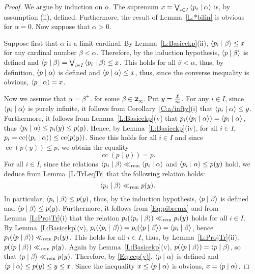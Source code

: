 \documentclass[psamsfonts,reqno]{memo-l}
\theoremstyle{plain}
\theoremstyle{definition}
\theoremstyle{remark}
\numberwithin{equation}{section}
\newcommand{\Cn}{\mathbf{2}_{\infty}}
\newcommand{\rem}{\ll_{\mathrm{rem}}}
\newcommand{\scal}[2]{\left\langle\nobreak#1\nobreak\mid\nobreak#2
\nobreak\right\rangle}
\newcommand{\di}[1]{\tfrac{\mathstrut\textstyle{#1}}{\scriptstyle{\infty}}}
\DeclareMathOperator{\cc}{cc}
\begin{document}
\begin{proof}
We argue by induction on $\alpha$.
The supremum $x=\bigvee_{i\in I}\scal{p_i}{\alpha}$ is, by assumption
(ii), defined. Furthermore, the result of Lemma~\ref{L:*bilin} is obvious
for $\alpha=0$. Now suppose that $\alpha>0$.

Suppose first that $\alpha$ is a limit cardinal. By
Lemma~\ref{L:Basicekp}(ii), $\scal{p_i}{\beta}\leq x$ for any cardinal
number $\beta<\alpha$. Therefore, by the induction hypothesis,
$\scal{p}{\beta}$ is defined and
$\scal{p}{\beta}=\bigvee_{i\in I}\scal{p_i}{\beta}\leq x$. This holds for
all $\beta<\alpha$, thus, by definition,
$\scal{p}{\alpha}$ is defined and $\scal{p}{\alpha}\leq x$, thus, since the
converse inequality is obvious, $\scal{p}{\alpha}=x$.

Now we assume that $\alpha=\beta^+$, for some $\beta\in\Cn$.
Put $y=\di{x}$. For any $i\in I$, since $\scal{p_i}{\alpha}$ is purely
infinite, it follows from Corollary~\ref{C:a/infty}(i) that
$\scal{p_i}{\alpha}\leq y$. Furthermore, it follows from
Lemma~\ref{L:Basicekp}(v) that
$p_i(\scal{p_i}{\alpha})=\scal{p_i}{\alpha}$, thus
$\scal{p_i}{\alpha}\leq p_i(y)\leq p(y)$. Hence, by
Lemma~\ref{L:Basicekp}(iv), for all $i\in I$,
$p_i=\cc(\scal{p_i}{\alpha})\leq\cc(p(y))$. Since this holds for all $i\in
I$ and since $\cc(p(y))\leq p$, we obtain the equality
   \begin{equation}\label{Eq:ccp(y)}
   \cc(p(y))=p.
   \end{equation}
For all $i\in I$, since the relations
$\scal{p_i}{\beta}\rem\scal{p_i}{\alpha}$ and $\scal{p_i}{\alpha}\leq p(y)$
hold, we deduce from Lemma~\ref{L:TrLeqTr} that the following relation
holds:
   \begin{equation}\label{Eq:pibremx}
   \scal{p_i}{\beta}\rem p(y).
   \end{equation}
In particular, $\scal{p_i}{\beta}\leq p(y)$, thus, by the induction
hypothesis, $\scal{p}{\beta}$ is defined and $\scal{p}{\beta}\leq p(y)$.
Furthermore, it follows from \eqref{Eq:pibremx} and from
Lemma~\ref{L:ProjTr}(i) that the relation
$p_i(\scal{p_i}{\beta})\rem p_i(y)$ holds for all $i\in I$. By
Lemma~\ref{L:Basicekp}(v),
$p_i(\scal{p_i}{\beta})=p_i(\scal{p}{\beta})=\scal{p_i}{\beta}$, hence
$p_i(\scal{p}{\beta})\rem p_i(y)$. This holds for all $i\in I$, thus, by
Lemma~\ref{L:ProjTr}(ii), $p(\scal{p}{\beta})\rem p(y)$. Again by
Lemma~\ref{L:Basicekp}(v), $p(\scal{p}{\beta})=\scal{p}{\beta}$, so that
$\scal{p}{\beta}\rem p(y)$. Therefore, by \eqref{Eq:ccp(y)},
$\scal{p}{\alpha}$ is defined and $\scal{p}{\alpha}\leq p(y)\leq y\leq x$.
Since the inequality $x\leq\scal{p}{\alpha}$ is obvious,
$x=\scal{p}{\alpha}$.
\end{proof}
\end{document}
